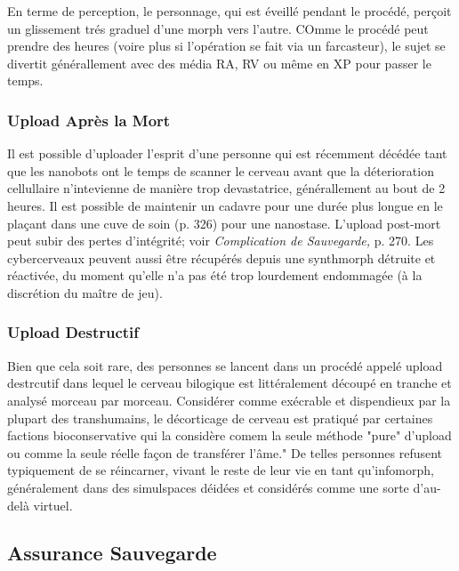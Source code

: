 En terme de perception, le personnage, qui est éveillé pendant le procédé, perçoit un glissement trés graduel d'une morph vers l'autre. COmme le procédé peut prendre des heures (voire plus si l'opération se fait via un farcasteur), le sujet se divertit générallement avec des média RA, RV ou même en XP pour passer le temps. 

\subsubsection{Upload Après la Mort} 

Il est possible d'uploader l'esprit d'une personne qui est récemment décédée tant que les nanobots ont le temps de scanner le cerveau avant que la déterioration cellullaire n'intevienne de manière trop devastatrice, générallement au bout de 2 heures. Il est possible de maintenir un cadavre pour une durée plus longue en le plaçant dans une cuve de soin (p. 326) pour une nanostase. L'upload post-mort peut subir des pertes d'intégrité; voir \textit{Complication de Sauvegarde}\textit{, } p. 270. Les cybercerveaux peuvent aussi être récupérés depuis une synthmorph détruite et réactivée, du moment qu'elle n'a pas été trop lourdement endommagée (à la discrétion du maître de jeu). 

\subsubsection{Upload Destructif} 

Bien que cela soit rare, des personnes se lancent dans un procédé appelé upload destrcutif dans lequel le cerveau bilogique est littéralement découpé en tranche et analysé morceau par morceau. Considérer comme exécrable et dispendieux par la plupart des transhumains, le décorticage de cerveau est pratiqué par certaines factions bioconservative qui la considère comem la seule méthode "pure" d'upload ou comme la seule réelle façon de transférer l'âme." De telles personnes refusent typiquement de se réincarner, vivant le reste de leur vie en tant qu'infomorph, généralement dans des simulspaces déidées et considérés comme une sorte d'au-delà virtuel. 

\subsection{Assurance Sauvegarde} 

